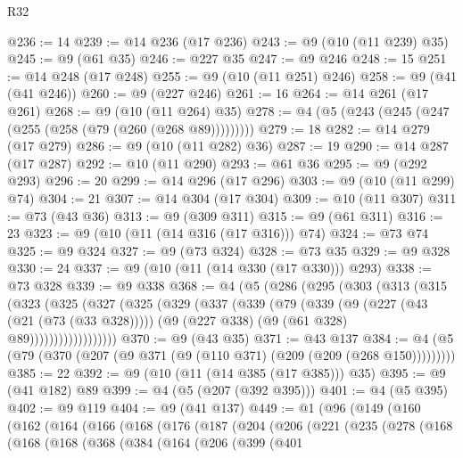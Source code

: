 \begin{lexlean}{R32}
\begin{coremodule}
@236 := 14
@239 := @14 @236 (@17 @236)
@243 := @9 (@10 (@11 @239) @35)
@245 := @9 (@61 @35)
@246 := @227 @35
@247 := @9 @246
@248 := 15
@251 := @14 @248 (@17 @248)
@255 := @9 (@10 (@11 @251) @246)
@258 := @9 (@41 (@41 @246))
@260 := @9 (@227 @246)
@261 := 16
@264 := @14 @261 (@17 @261)
@268 := @9 (@10 (@11 @264) @35)
@278 := @4 (@5 (@243 (@245 (@247 (@255 (@258 (@79 (@260 (@268 @89)))))))))
@279 := 18
@282 := @14 @279 (@17 @279)
@286 := @9 (@10 (@11 @282) @36)
@287 := 19
@290 := @14 @287 (@17 @287)
@292 := @10 (@11 @290)
@293 := @61 @36
@295 := @9 (@292 @293)
@296 := 20
@299 := @14 @296 (@17 @296)
@303 := @9 (@10 (@11 @299) @74)
@304 := 21
@307 := @14 @304 (@17 @304)
@309 := @10 (@11 @307)
@311 := @73 (@43 @36)
@313 := @9 (@309 @311)
@315 := @9 (@61 @311)
@316 := 23
@323 := @9 (@10 (@11 (@14 @316 (@17 @316))) @74)
@324 := @73 @74
@325 := @9 @324
@327 := @9 (@73 @324)
@328 := @73 @35
@329 := @9 @328
@330 := 24
@337 := @9 (@10 (@11 (@14 @330 (@17 @330))) @293)
@338 := @73 @328
@339 := @9 @338
@368 := @4
    (@5
      (@286
        (@295
          (@303
            (@313
              (@315
                (@323
                  (@325
                    (@327
                      (@325
                        (@329
                          (@337
                            (@339
                              (@79
                                (@339
                                  (@9
                                    (@227 (@43 (@21 (@73 (@33 @328)))))
                                    (@9 (@227 @338) (@9 (@61 @328) @89))))))))))))))))))
@370 := @9 (@43 @35)
@371 := @43 @137
@384 := @4 (@5 (@79 (@370 (@207 (@9 @371 (@9 (@110 @371) (@209 (@209 (@268 @150)))))))))
@385 := 22
@392 := @9 (@10 (@11 (@14 @385 (@17 @385))) @35)
@395 := @9 (@41 @182) @89
@399 := @4 (@5 (@207 (@392 @395)))
@401 := @4 (@5 @395)
@402 := @9 @119
@404 := @9 (@41 @137)
@449 := @1
    (@96
      (@149
        (@160
          (@162
            (@164
              (@166
                (@168
                  (@176
                    (@187
                      (@204
                        (@206
                          (@221
                            (@235
                              (@278
                                (@168
                                  (@168
                                    (@168
                                      (@368
                                        (@384
                                          (@164
                                            (@206
                                              (@399
                                                (@401

\end{coremodule}
\end{lexlean}
